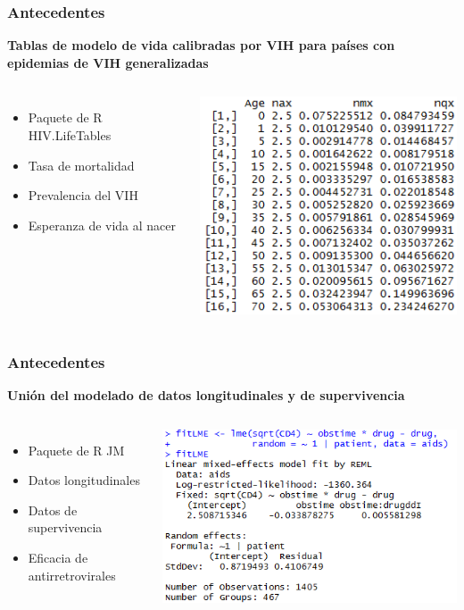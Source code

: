 \documentclass{beamer}%
\begin{document}
\begin{frame}
\frametitle{\textbf{Antecedentes}}
\textbf{Tablas de modelo de vida calibradas por VIH para países con epidemias de VIH generalizadas}
 \begin{columns}[t]
	\begin{itemize}
	\item Paquete de R HIV.LifeTables
	\item Tasa de mortalidad
	\item Prevalencia del VIH
	\item Esperanza de vida al nacer
	\end{itemize}
  	\begin{center}\includegraphics[height=0.4\textheight]{HIVTables.PNG}\end{center}
  \end{columns}
\end{frame}

\begin{frame}
\frametitle{\textbf{Antecedentes}}
\textbf{Uni\'on del modelado de datos longitudinales y de supervivencia}
\begin{columns}[t]
	\begin{itemize}
	\item Paquete de R JM
	\item Datos longitudinales
	\item Datos de supervivencia
	\item Eficacia de antirretrovirales
	\end{itemize}
  	\begin{center}\includegraphics[height=0.4\textheight]{JM.PNG}\end{center}
  \end{columns}

\end{frame}
\end{document}

